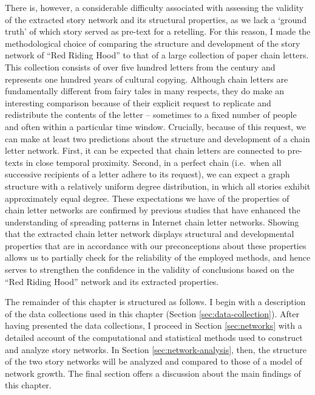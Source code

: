 There is, however, a considerable difficulty associated with assessing the validity of the extracted story network and its structural properties, as we lack a `ground truth' of which story served as pre-text for a retelling. For this reason, I made the methodological choice of comparing the structure and development of the story network of ``Red Riding Hood'' to that of a large collection of paper chain letters. This collection consists of over five hundred letters from the  century and represents one hundred years of cultural copying. Although chain letters are fundamentally different from fairy tales in many respects, they do make an interesting comparison because of their explicit request to replicate and redistribute the contents of the letter -- sometimes to a fixed number of people and often within a particular time window. Crucially, because of this request, we can make at least two predictions about the structure and development of a chain letter network. First, it can be expected that chain letters are connected to pre-texts in close temporal proximity. Second, in a perfect chain (i.e.\ when all successive recipients of a letter adhere to its request), we can expect a graph structure with a relatively uniform degree distribution, in which all stories exhibit approximately equal degree. These expectations we have of the properties of chain letter networks are confirmed by previous studies that have enhanced the understanding of spreading patterns in Internet chain letter networks\autocite{liben-nowell:2008}. Showing that the extracted chain letter network displays structural and developmental properties that are in accordance with our preconceptions about these properties allows us to partially check for the reliability of the employed methods, and hence serves to strengthen the confidence in the validity of conclusions based on the ``Red Riding Hood'' network and its extracted properties.

The remainder of this chapter is structured as follows. I begin with a description of the data collections used in this chapter (Section \ref{sec:data-collection}). After having presented the data collections, I proceed in Section \ref{sec:networks} with a detailed account of the computational and statistical methods used to construct and analyze story networks. In Section \ref{sec:network-analysis}, then, the structure of the two story networks will be analyzed and compared to those of a model of network growth. The final section offers a discussion about the main findings of this chapter.

